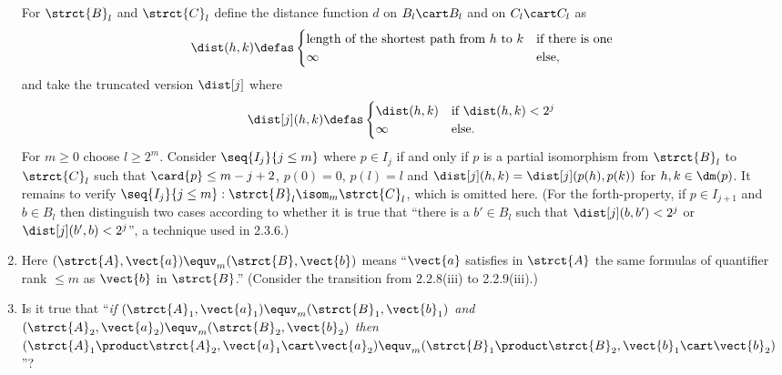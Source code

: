 \begin{enumerate}[1.]
\newpar
For $\strct{B}_l$ and $\strct{C}_l$ define the distance function $d$ on $B_l \cart B_l$ and on $C_l \cart C_l$ as
\[
\dist(h, k) \defas
\begin{cases}
\mbox{length of the shortest path from \begin{math}h\end{math} to \begin{math}k\end{math}} & \mbox{if there is one} \cr
\infty & \mbox{else},
\end{cases}
\]
and take the truncated version $\dist[j]$ where
\[
\dist[j](h, k) \defas
\begin{cases}
\dist(h, k) & \mbox{if \begin{math}\dist(h, k) < 2^j\end{math}} \cr
\infty & \mbox{else}.
\end{cases}
\]
For $m \geq 0$ choose $l \geq 2^m$. Consider $\seq{I_j}{j \leq m}$ where $p \in I_j$ if and only if $p$ is a partial isomorphism from $\strct{B}_l$ to $\strct{C}_l$ such that $\card{p} \leq m - j + 2$, $p(0) = 0$, $p(l) = l$ and $\dist[j](h, k) = \dist[j](p(h), p(k))$ for $h, k \in \dm(p)$.
\newpar
It remains to verify $\seq{I_j}{j \leq m} : \strct{B}_l \isom_m \strct{C}_l$, which is omitted here. (For the forth-property, if $p \in I_{j + 1}$ and $b \in B_l$ then distinguish two cases according to whether it is true that ``there is a $b' \in B_l$ such that $\dist[j](b, b') < 2^j$ or $\dist[j](b', b) < 2^j$'', a technique used in 2.3.6.)
%
\item {} Here $(\strct{A}, \vect{a}) \equv_m (\strct{B}, \vect{b})$ means ``$\vect{a}$ satisfies in $\strct{A}$ the same formulas of quantifier rank $\leq m$ as $\vect{b}$ in $\strct{B}$.'' (Consider the transition from 2.2.8(iii) to 2.2.9(iii).)
%
\item {} Is it true that ``\emph{if $(\strct{A}_1, \vect{a}_1) \equv_m (\strct{B}_1, \vect{b}_1)$ and $(\strct{A}_2, \vect{a}_2) \equv_m (\strct{B}_2, \vect{b}_2)$ then $(\strct{A}_1 \product \strct{A}_2, \vect{a}_1 \cart \vect{a}_2) \equv_m (\strct{B}_1 \product \strct{B}_2, \vect{b}_1 \cart \vect{b}_2)$}''?


\end{enumerate}

